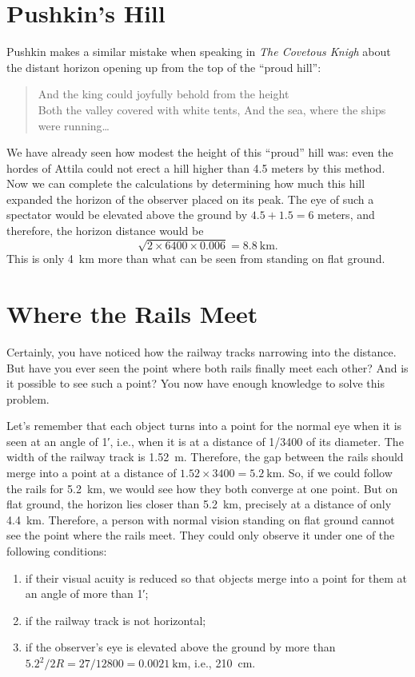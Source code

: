 \section{Pushkin's Hill}

Pushkin makes a similar mistake when speaking in \emph{The Covetous Knigh} about the distant horizon opening up from the top of the ``proud hill'':
\begin{quote}
And the king could joyfully behold from the height\\
Both the valley covered with white tents, And the sea, where the ships were running\dots{}
\end{quote}
We have already seen how modest the height of this ``proud'' hill was: even the hordes of Attila could not erect a hill higher than 4.5 meters by this method. Now we can complete the calculations by determining how much this hill expanded the horizon of the observer placed on its peak. The eye of such a spectator would be elevated above the ground by $4.5 + 1.5 = 6$ meters, and therefore, the horizon distance would be 
\begin{equation*}%
\sqrt{2 \times 6400 \times 0.006} = \SI{8.8}{\kilo\meter}.
\end{equation*}
This is only \SI{4}{\kilo\meter} more than what can be seen from standing on flat ground.


\section{Where the Rails Meet}
\label{sec-6.6}

\ques Certainly, you have noticed how the railway tracks narrowing into the distance. But have you ever seen the point where both rails finally meet each other? And is it possible to see such a point? You now have enough knowledge to solve this problem.

\ans Let's remember that each object turns into a point for the normal eye when it is seen at an angle of \ang{;1}, i.e., when it is at a distance of 1/3400 of its diameter. The width of the railway track is \SI{1.52}{\meter}. Therefore, the gap between the rails should merge into a point at a distance of $1.52 \times 3400 = \SI{5.2}{\kilo\meter}$. So, if we could follow the rails for \SI{5.2}{\kilo\meter}, we would see how they both converge at one point. But on flat ground, the horizon lies closer than \SI{5.2}{\kilo\meter}, precisely at a distance of only \SI{4.4}{\kilo\meter}. Therefore, a person with normal vision standing on flat ground cannot see the point where the rails meet. They could only observe it under one of the following conditions:
\begin{enumerate}
\item if their visual acuity is reduced so that objects merge into a point for them at an angle of more than \ang{;1};
\item if the railway track is not horizontal;
\item if the observer's eye is elevated above the ground by more than $5.2^{2}/2R = 27/12800 = \SI{0.0021}{\kilo\meter}$, i.e., \SI{210}{\centi\meter}.
\end{enumerate}

